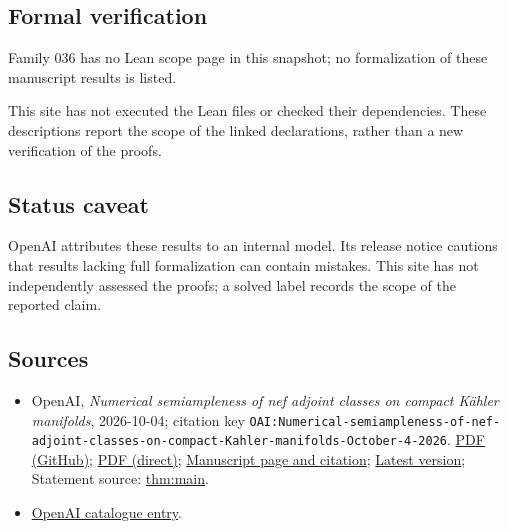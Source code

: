 \documentclass[11pt]{article}
\begin{document}
\subsection{Formal verification}
Family 036 has no Lean scope page in this snapshot; no formalization of these manuscript results is listed.

This site has not executed the Lean files or checked their dependencies. These descriptions report the scope of the linked declarations, rather than a new verification of the proofs.

\subsection{Status caveat}
OpenAI attributes these results to an internal model. Its release notice cautions that results lacking full formalization can contain mistakes. This site has not independently assessed the proofs; a solved label records the scope of the reported claim.

\subsection{Sources}
\begin{itemize}
\item OpenAI, \emph{Numerical semiampleness of nef adjoint classes on compact Kähler manifolds}, 2026-10-04; citation key \texttt{OAI:Numerical-semiampleness-of-nef-adjoint-classes-on-compact-Kahler-manifolds-October-4-2026}. \href{https://github.com/openai/math/blob/adc7f1241b42e322a6451854ab7e4b4c146bf78a/preprints/Numerical-semiampleness-of-nef-adjoint-classes-on-compact-Kahler-manifolds-October-4-2026/numerical-generalized-abundance.pdf}{PDF (GitHub)}; \href{https://github.com/openai/math/raw/adc7f1241b42e322a6451854ab7e4b4c146bf78a/preprints/Numerical-semiampleness-of-nef-adjoint-classes-on-compact-Kahler-manifolds-October-4-2026/numerical-generalized-abundance.pdf}{PDF (direct)}; \href{https://github.com/openai/math/blob/adc7f1241b42e322a6451854ab7e4b4c146bf78a/preprints/Numerical-semiampleness-of-nef-adjoint-classes-on-compact-Kahler-manifolds-October-4-2026/README.md}{Manuscript page and citation}; \href{https://github.com/openai/math/blob/main/preprints/Numerical-semiampleness-of-nef-adjoint-classes-on-compact-Kahler-manifolds-October-4-2026/numerical-generalized-abundance.pdf}{Latest version}; Statement source: \href{https://github.com/openai/math/blob/adc7f1241b42e322a6451854ab7e4b4c146bf78a/preprints/Numerical-semiampleness-of-nef-adjoint-classes-on-compact-Kahler-manifolds-October-4-2026/build/sections/01-introduction.tex\#L19}{thm:main}.
\item \href{https://github.com/openai/math/blob/adc7f1241b42e322a6451854ab7e4b4c146bf78a/CONTENTS.md}{OpenAI catalogue entry}.
\end{itemize}
\end{document}
